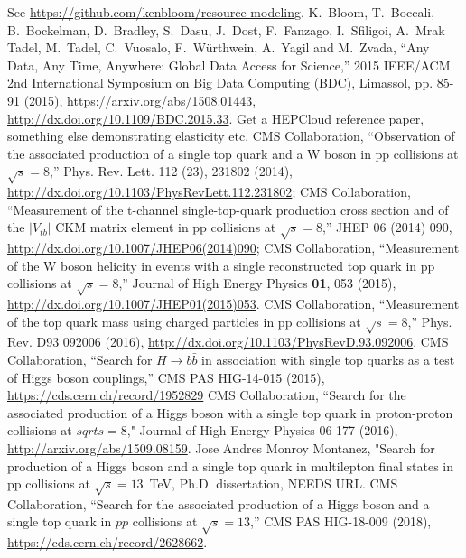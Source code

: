 \begin{thebibliography}{99}
  See
  \url{https://github.com/kenbloom/resource-modeling}.
 K.~Bloom, T.~Boccali, B.~Bockelman, D.~Bradley, S.~Dasu,
  J.~Dost, F.~Fanzago, I.~Sfiligoi, A.~Mrak Tadel, M.~Tadel, C.~Vuosalo,
  F.~W{\"u}rthwein, A.~Yagil and M.~Zvada, ``Any Data, Any Time, Anywhere:
  Global Data Access for Science,'' 2015 IEEE/ACM 2nd International
  Symposium on Big Data Computing (BDC), Limassol, pp. 85-91 (2015),
  \url{https://arxiv.org/abs/1508.01443}, \url{http://dx.doi.org/10.1109/BDC.2015.33}.
 Get a HEPCloud reference paper, something else demonstrating elasticity etc.
%
CMS Collaboration, ``Observation of the associated production of a single top quark and a W boson in pp collisions at $\sqrt{s}=$8\TeV,'' Phys. Rev. Lett. 112 (23), 231802 (2014), \url{http://dx.doi.org/10.1103/PhysRevLett.112.231802};
%
CMS Collaboration, ``Measurement of the t-channel single-top-quark production cross section and of the $|V_{tb}|$ CKM matrix element in pp collisions at $\sqrt{s} = 8$\TeV,'' JHEP 06 (2014) 090, \url{http://dx.doi.org/10.1007/JHEP06(2014)090};
%
CMS Collaboration, ``Measurement of the W boson helicity in events with a
single reconstructed top quark in pp collisions at $\sqrt{s}=$8\TeV,''
Journal of High Energy Physics {\bf 01},  053 (2015),
\url{http://dx.doi.org/10.1007/JHEP01(2015)053}.
 CMS Collaboration, ``Measurement of the top quark mass using charged
 particles in pp collisions at $\sqrt{s} = 8$\TeV,'' Phys. Rev.  D93 092006
 (2016), \url{http://dx.doi.org/10.1103/PhysRevD.93.092006}. 
 CMS Collaboration, ``Search for $H \to b\bar{b}$ in
  association with single top quarks as a test of Higgs boson couplings,'' CMS PAS HIG-14-015 (2015), \url{https://cds.cern.ch/record/1952829}
 CMS Collaboration, ``Search for the associated
  production of a Higgs boson with a single top quark in proton-proton
  collisions at $sqrt{s} = 8$\TeV," Journal of High Energy Physics 06 177 (2016), \url{http://arxiv.org/abs/1509.08159}.
   Jose Andres Monroy Montanez, "Search for production of a Higgs boson and a single top quark in multilepton final states in pp collisions at $\sqrt{s} = 13$~TeV, Ph.D. dissertation, NEEDS URL.
   CMS Collaboration, ``Search for the associated
    production of a Higgs boson and a single top quark in $pp$ collisions
    at $\sqrt{s} = 13$\TeV,'' CMS PAS HIG-18-009 (2018),
    \url{https://cds.cern.ch/record/2628662}.

\end{thebibliography}
